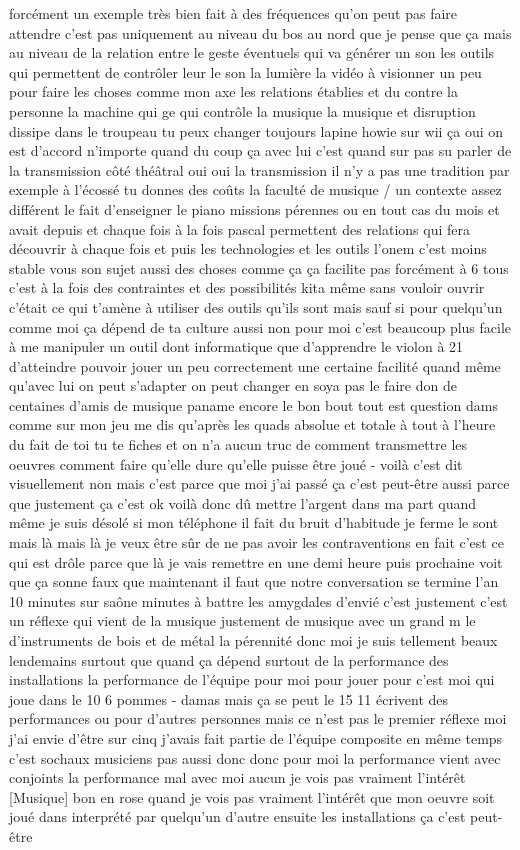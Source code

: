 forcément un exemple très bien fait à des fréquences qu'on peut pas faire attendre c'est pas uniquement au niveau du bos au nord que je pense que ça mais au niveau de la relation entre le geste éventuels qui va générer un son les outils qui permettent de contrôler leur le son la lumière la vidéo à visionner un peu pour faire les choses comme mon axe les relations établies et du contre la personne la machine qui ge qui contrôle la musique la musique et disruption dissipe dans le troupeau tu peux changer toujours lapine howie sur wii ça oui on est d'accord n'importe quand du coup ça avec lui c'est quand sur pas su parler de la transmission côté théâtral oui oui la transmission il n'y a pas une tradition par exemple à l'écossé tu donnes des coûts la faculté de musique / un contexte assez différent le fait d'enseigner le piano missions pérennes ou en tout cas du mois et avait depuis et chaque fois à la fois pascal permettent des relations qui fera découvrir à chaque fois et puis les technologies et les outils l'onem c'est moins stable vous son sujet aussi des choses comme ça ça facilite pas forcément à 6 tous c'est à la fois des contraintes et des possibilités kita même sans vouloir ouvrir c'était ce qui t'amène à utiliser des outils qu'ils sont mais sauf si pour quelqu'un comme moi ça dépend de ta culture aussi non pour moi c'est beaucoup plus facile à me manipuler un outil dont informatique que d'apprendre le violon à 21 d'atteindre pouvoir jouer un peu correctement une certaine facilité quand même qu'avec lui on peut s'adapter on peut changer en soya pas le faire don de centaines d'amis de musique paname encore le bon bout tout est question dams comme sur mon jeu me dis qu'après les quads absolue et totale à tout à l'heure du fait de toi tu te fiches et on n'a aucun truc de comment transmettre les oeuvres comment faire qu'elle dure qu'elle puisse être joué - voilà c'est dit visuellement non mais c'est parce que moi j'ai passé ça c'est peut-être aussi parce que justement ça c'est ok voilà donc dû mettre l'argent dans ma part quand même je suis désolé si mon téléphone il fait du bruit d'habitude je ferme le sont mais là mais là je veux être sûr de ne pas avoir les contraventions en fait c'est ce qui est drôle parce que là je vais remettre en une demi heure puis prochaine voit que ça sonne faux que maintenant il faut que notre conversation se termine l'an 10 minutes sur saône minutes à battre les amygdales d'envié c'est justement c'est un réflexe qui vient de la musique justement de musique avec un grand m le d'instruments de bois et de métal la pérennité donc moi je suis tellement beaux lendemains surtout que quand ça dépend surtout de la performance des installations la performance de l'équipe pour moi pour jouer pour c'est moi qui joue dans le 10 6 pommes - damas mais ça se peut le 15 11 écrivent des performances ou pour d'autres personnes mais ce n'est pas le premier réflexe moi j'ai envie d'être sur cinq j'avais fait partie de l'équipe composite en même temps c'est sochaux musiciens pas aussi donc donc pour moi la performance vient avec conjoints la performance mal avec moi aucun je vois pas vraiment l'intérêt [Musique] bon en rose quand je vois pas vraiment l'intérêt que mon oeuvre soit joué dans interprété par quelqu'un d'autre ensuite les installations ça c'est peut-être 